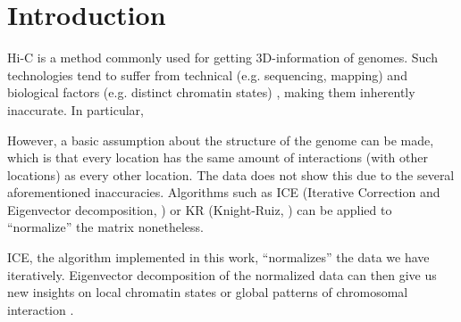 \chapter{Introduction}\label{chap:introduction}

%
%
%
%
%
%


Hi-C is a method commonly used for getting 3D-information of genomes. Such
technologies tend to suffer from technical (e.g. sequencing, mapping)
\cite{pmid21646344} and biological factors (e.g. distinct chromatin states)
\cite{pmid19693276}, making them inherently inaccurate. In particular, 


However, a basic assumption about the structure of the genome can be made,
which is that every location has the same amount of interactions (with other
locations) as every other location. The data does not show this due to the
several aforementioned inaccuracies. Algorithms such as ICE (Iterative
Correction and Eigenvector decomposition, ) or KR (Knight-Ruiz,
) can be applied to ``normalize'' the matrix nonetheless.

ICE, the algorithm implemented in this work, ``normalizes'' the data we
have iteratively. Eigenvector decomposition of the normalized data can then
give us new insights on local chromatin states or global patterns of
chromosomal interaction \cite{imakaev2012iterative}.

